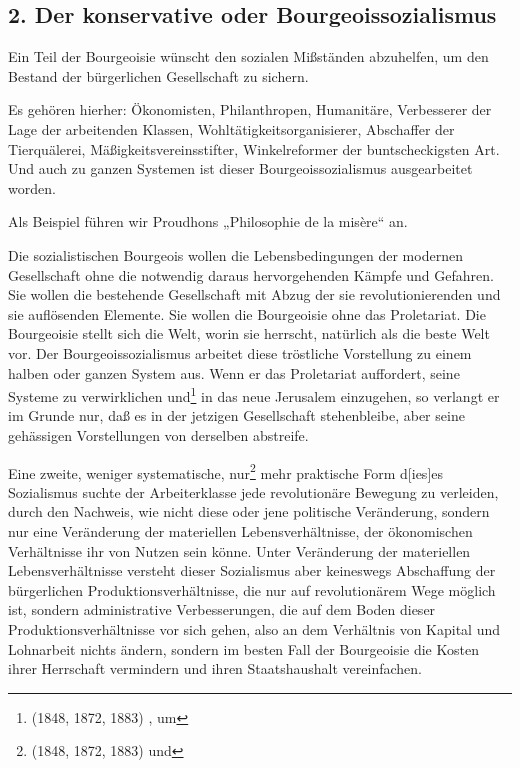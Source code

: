\documentclass[letterpaper]{article}
\begin{document}
\subsection{2. Der konservative oder Bourgeoissozialismus}

Ein Teil der Bourgeoisie wünscht den sozialen Mißständen abzuhelfen, um den Bestand der bürgerlichen Gesellschaft zu sichern.

Es gehören hierher: Ökonomisten, Philanthropen, Humanitäre, Verbesserer der Lage der arbeitenden Klassen, Wohltätigkeitsorganisierer, Abschaffer der Tierquälerei, Mäßigkeitsvereinsstifter, Winkelreformer der buntscheckigsten Art. Und auch zu ganzen Systemen ist dieser Bourgeoissozialismus ausgearbeitet worden.

Als Beispiel führen wir Proudhons „Philosophie de la misère“ an.

Die sozialistischen Bourgeois wollen die Lebensbedingungen der modernen Gesellschaft ohne die notwendig daraus hervorgehenden Kämpfe und Gefahren. Sie wollen die bestehende Gesellschaft mit Abzug der sie revolutionierenden und sie auflösenden Elemente. Sie wollen die Bourgeoisie ohne das Proletariat. Die Bourgeoisie stellt sich die Welt, worin sie herrscht, natürlich als die beste Welt vor. Der Bourgeoissozialismus arbeitet diese tröstliche Vorstellung zu einem halben oder ganzen System aus. Wenn er das Proletariat auffordert, seine Systeme zu verwirklichen und\footnote{(1848, 1872, 1883) , um} in das neue Jerusalem einzugehen, so verlangt er im Grunde nur, daß es in der jetzigen Gesellschaft stehenbleibe, aber seine gehässigen Vorstellungen von derselben abstreife.

Eine zweite, weniger systematische, nur\footnote{(1848, 1872, 1883) und} mehr praktische Form d[ies]es Sozialismus suchte der Arbeiterklasse jede revolutionäre Bewegung zu verleiden, durch den Nachweis, wie nicht diese oder jene politische Veränderung, sondern nur eine Veränderung der materiellen Lebensverhältnisse, der ökonomischen Verhältnisse ihr von Nutzen sein könne. Unter Veränderung der materiellen Lebensverhältnisse versteht dieser Sozialismus aber keineswegs Abschaffung der bürgerlichen Produktionsverhältnisse, die nur auf revolutionärem Wege möglich ist, sondern administrative Verbesserungen, die auf dem Boden dieser Produktionsverhältnisse vor sich gehen, also an dem Verhältnis von Kapital und Lohnarbeit nichts ändern, sondern im besten Fall der Bourgeoisie die Kosten ihrer Herrschaft vermindern und ihren Staatshaushalt vereinfachen.
\end{document}
